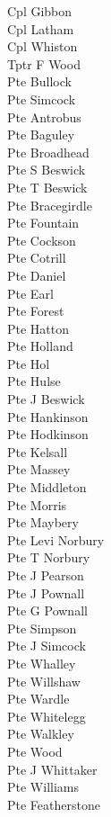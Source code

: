 \begin{multicols}{3}
  Cpl Gibbon \\
  Cpl Latham \\
  Cpl Whiston \\
  Tptr F Wood \\
  Pte Bullock \\
  Pte Simcock \\
  Pte Antrobus \\
  Pte Baguley \\
  Pte Broadhead \\
  Pte S Beswick \\
  Pte T Beswick \\
  Pte Bracegirdle \\
  Pte Fountain \\
  Pte Cockson \\
  Pte Cotrill \\
  Pte Daniel \\
  Pte Earl \\
  Pte Forest \\
  Pte Hatton \\
  Pte Holland \\
  Pte Hol \\
  Pte Hulse \\
  Pte J Beswick \\
  Pte Hankinson \\
  Pte Hodkinson \\
  Pte Kelsall \\
  Pte Massey \\
  Pte Middleton \\
  Pte Morris \\
  Pte Maybery \\
  Pte Levi Norbury \\
  Pte T Norbury \\
  Pte J Pearson \\
  Pte J Pownall \\
  Pte G Pownall \\
  Pte Simpson \\
  Pte J Simcock \\
  Pte Whalley \\
  Pte Willshaw \\
  Pte Wardle \\
  Pte Whitelegg \\
  Pte Walkley \\
  Pte Wood \\
  Pte J Whittaker \\
  Pte Williams \\
  Pte Featherstone \\

\end{multicols}
